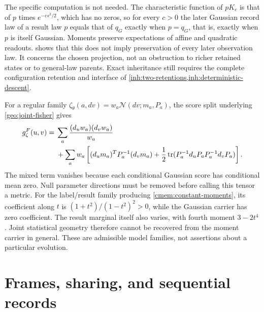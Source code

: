 The specific computation is not needed. The characteristic function of $pK_c$ is that of $p$ times $e^{-cs^2/2}$, which has no zeros, so for every $c>0$ the later Gaussian record law of a result law $p$ equals that of $q_G$ exactly when $p=q_G$, that is, exactly when $p$ is itself Gaussian. Moments preserve expectations of affine and quadratic readouts.  shows that this does not imply preservation of every later observation law. It concerns the chosen projection, not an obstruction to richer retained states or to general-law parents. Exact inheritance still requires the complete configuration retention and interface of \cref{inh:two-retentions,inh:deterministic-descent}.

For a regular family $\zeta_\theta(a,dv)=w_a\mathcal N(dv;m_a,P_a)$, the score split underlying \cref{geo:joint-fisher} gives
\begin{equation}
 \begin{split}
 g_\zeta^F(u,v)={}&\sum_a\frac{(d_uw_a)(d_vw_a)}{w_a}\\
 &+\sum_aw_a\left[(d_um_a)^TP_a^{-1}(d_vm_a)
 +\frac12\operatorname{tr}(P_a^{-1}d_uP_aP_a^{-1}d_vP_a)\right].
 \end{split}
 \label{cmem:joint-fisher}
\end{equation}
The mixed term vanishes because each conditional Gaussian score has conditional mean zero. Null parameter directions must be removed before calling this tensor a metric. For the label/result family producing \cref{cmem:constant-moments}, its coefficient along $t$ is $(1+t^2)/(1-t^2)^2>0$, while the Gaussian carrier has zero coefficient. The result marginal itself also varies, with fourth moment $3-2t^4$. Joint statistical geometry therefore cannot be recovered from the moment carrier in general. These are admissible model families, not assertions about a particular evolution.

\section{Frames, sharing, and sequential records}

